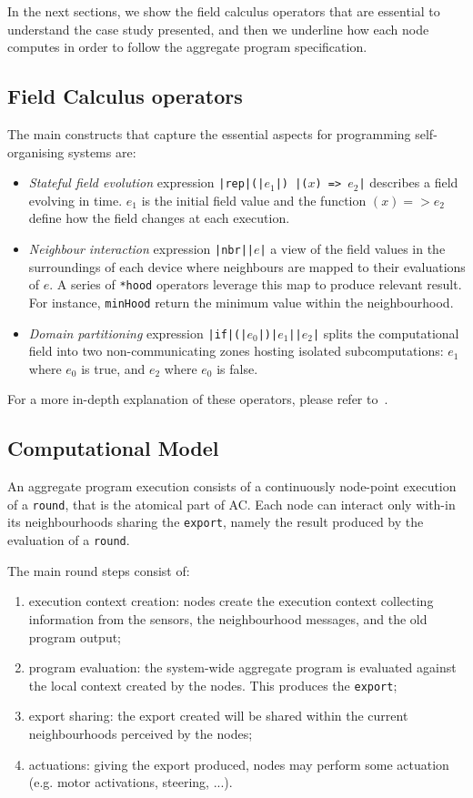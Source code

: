 \documentclass[conference]{IEEEtran}
\newcommand{\round}{\texttt{round}}
\newcommand{\export}{\texttt{export}}
\begin{document}
In the next sections, we show the field calculus operators that are essential to understand the case study presented,
 and then we underline how each node computes in order to follow the aggregate program specification.
\subsection{Field Calculus operators}
The main constructs that capture the essential aspects for programming self-organising systems are:
\begin{itemize}
  \item \textit{Stateful field evolution} expression \texttt{|{\color{teal}rep}|(|$e_1$|) {|($x$) => $e_2$|}} describes a field evolving in time. 
  $e_1$ is the initial field value and the function $(x) => e_2$ define how the field changes at each execution.
  \item \textit{Neighbour interaction} expression \texttt{|\color{teal}nbr|{|$e$|}} a view
  of the field values in the surroundings of each device where neighbours are
  mapped to their evaluations of $e$. A series of \texttt{*hood} operators leverage this map to produce relevant result. 
  For instance, \texttt{minHood} return the minimum value 
  within the neighbourhood.
  \item \textit{Domain partitioning} expression \texttt{|\color{teal}if|(|$e_0$|){|$e_1$|}{|$e_2$|}} splits the computational
  field into two non-communicating zones hosting isolated subcomputations:
  $e_1$ where $e_0$ is true, and $e_2$ where $e_0$ is false.
\end{itemize}
For a more in-depth explanation of these operators, please refer to~\cite{DBLP:journals/computer/BealPV15}.

\subsection{Computational Model}
An aggregate program execution consists of a continuously node-point execution of a \round{}, 
 that is the atomical part of AC. Each node can interact only with-in its neighbourhoods sharing the \export{}, namely the result produced by the evaluation of a \round{}.

The main round steps consist of:
\begin{enumerate}
  \item execution context creation: nodes create the execution context collecting information from the sensors, 
  the neighbourhood messages, and the old program output;
  \item program evaluation: the system-wide aggregate program is evaluated against the local context created by the nodes. 
  This produces the \export{};
  \item export sharing: the export created will be shared within the current neighbourhoods perceived by the nodes;
  \item actuations: giving the export produced, nodes may perform some actuation (e.g. motor activations, steering, ...).
\end{enumerate}
\end{document}
